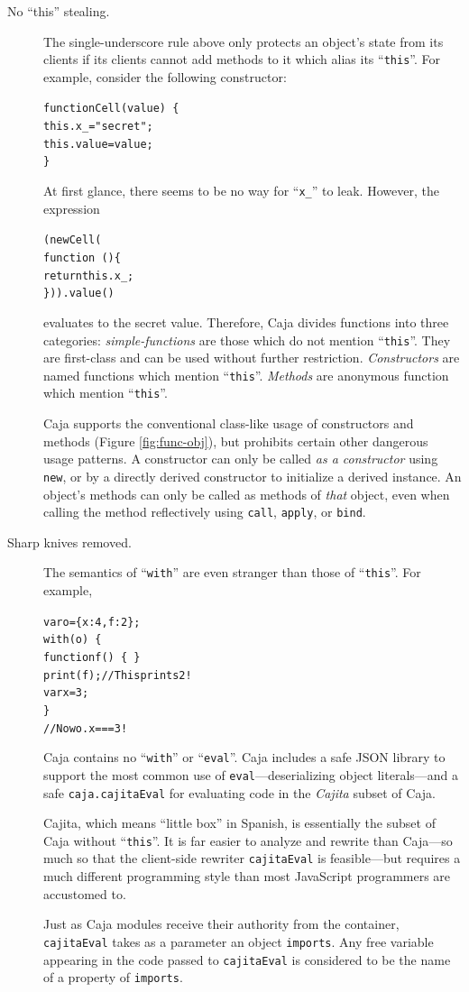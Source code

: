 \documentclass[letterpaper,twocolumn,10pt]{article}
\newcommand{\code}[1]{{\tt {#1}}}              %
\begin{document}
\begin{description}
  \item[No ``this'' stealing.]  
  The single-underscore rule above only protects 
  an object's state from its clients if its clients cannot add methods to it 
  which alias its ``\code{this}''.  For example, consider the following
  constructor:
\begin{alltt}
function Cell(value)\ \{
  this.x_ = "secret";
  this.value = value;
\}
\end{alltt}
  At first glance, there seems to be no way for ``\code{x\_}'' to leak.
  However, the expression
\begin{alltt}
(new Cell( 
    function\ ()\{ 
      return this.x_; 
    \})).value()
\end{alltt}
  evaluates to the secret value.  Therefore, Caja divides functions into three 
  categories: \emph{simple-functions} are those which do not mention 
  ``\code{this}''. They are first-class and can be used without further 
  restriction. \emph{Constructors} are named functions which mention 
  ``\code{this}''. \emph{Methods} are anonymous function which mention 
  ``\code{this}''.
  
  Caja supports the conventional class-like usage of constructors and methods 
  (Figure \ref{fig:func-obj}), but 
  prohibits certain other dangerous usage patterns. A constructor can only be 
  called \emph{as a constructor} using \code{new}, or by a directly derived 
  constructor to initialize a derived instance. An object's methods can only 
  be called as methods of \emph{that} object, even when calling the method 
  reflectively using \code{call}, \code{apply}, or \code{bind}.
 
  \item[Sharp knives removed.] \label{knives} The semantics of ``\code{with}'' are even
  stranger than those of ``\code{this}''.  For example,
\begin{alltt}
var o = \{ x: 4, f: 2 \};
with(o)\ \{
  function f()\ \{\ \}
  print(f); // This prints 2!
  var x = 3;
\}
// Now o.x === 3 !
\end{alltt}
   Caja contains no ``\code{with}'' or 
  ``\code{eval}''. Caja includes a safe JSON library to support the most 
  common use of \code{eval}---deserializing object literals---and a safe 
  \code{caja.cajitaEval} for evaluating code in the \emph{Cajita} subset 
  of Caja. 
  
  Cajita, which means ``little box'' in Spanish, is essentially 
  the subset of Caja without ``\code{this}''.  It is far easier to analyze
  and rewrite than Caja---so much so that the client-side rewriter \code{cajitaEval} is
  feasible---but requires a much different programming style than
  most JavaScript programmers are accustomed to.
  
  Just as Caja modules receive their authority from the container,
  \code{cajitaEval} takes as a parameter an object \code{imports}.
  Any free variable appearing in the code passed to \code{cajitaEval}
  is considered to be the name of a property of \code{imports}.
\end{description}
\end{document}
